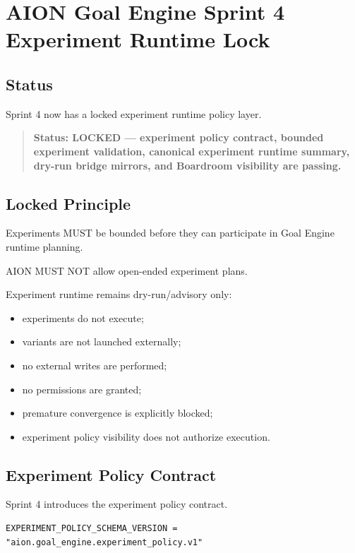 \section{AION Goal Engine Sprint 4 Experiment Runtime Lock}
\label{sec:aion-goal-engine-sprint4-experiment-runtime-lock}

\subsection{Status}

Sprint 4 now has a locked experiment runtime policy layer.

\begin{quote}
\textbf{Status: LOCKED --- experiment policy contract, bounded experiment validation, canonical experiment runtime summary, dry-run bridge mirrors, and Boardroom visibility are passing.}
\end{quote}

\subsection{Locked Principle}

Experiments MUST be bounded before they can participate in Goal Engine runtime planning.

AION MUST NOT allow open-ended experiment plans.

Experiment runtime remains dry-run/advisory only:

\begin{itemize}
  \item experiments do not execute;
  \item variants are not launched externally;
  \item no external writes are performed;
  \item no permissions are granted;
  \item premature convergence is explicitly blocked;
  \item experiment policy visibility does not authorize execution.
\end{itemize}

\subsection{Experiment Policy Contract}

Sprint 4 introduces the experiment policy contract.

\begin{verbatim}
EXPERIMENT_POLICY_SCHEMA_VERSION = "aion.goal_engine.experiment_policy.v1"
\end{verbatim}

